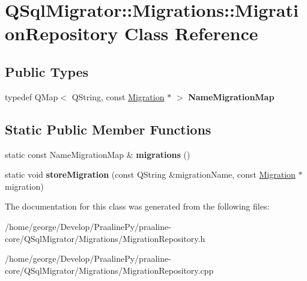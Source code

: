 \hypertarget{class_q_sql_migrator_1_1_migrations_1_1_migration_repository}{}\section{Q\+Sql\+Migrator\+:\+:Migrations\+:\+:Migration\+Repository Class Reference}
\label{class_q_sql_migrator_1_1_migrations_1_1_migration_repository}
\subsection*{Public Types}
\begin{DoxyCompactItemize}
\item 
\mbox{\label{class_q_sql_migrator_1_1_migrations_1_1_migration_repository_a5785cd65128bc316c2f01db2a0b40c44}} 
typedef Q\+Map$<$ Q\+String, const \hyperlink{class_q_sql_migrator_1_1_migrations_1_1_migration}{Migration} $\ast$ $>$ {\bfseries Name\+Migration\+Map}
\end{DoxyCompactItemize}
\subsection*{Static Public Member Functions}
\begin{DoxyCompactItemize}
\item 
\mbox{\label{class_q_sql_migrator_1_1_migrations_1_1_migration_repository_a3bd9136264bfe335175d62c8b2db08ee}} 
static const Name\+Migration\+Map \& {\bfseries migrations} ()
\item 
\mbox{\label{class_q_sql_migrator_1_1_migrations_1_1_migration_repository_a9c840ec789ab42b6caaa90b24203a087}} 
static void {\bfseries store\+Migration} (const Q\+String \&migration\+Name, const \hyperlink{class_q_sql_migrator_1_1_migrations_1_1_migration}{Migration} $\ast$migration)
\end{DoxyCompactItemize}


The documentation for this class was generated from the following files\+:\begin{DoxyCompactItemize}
\item 
/home/george/\+Develop/\+Praaline\+Py/praaline-\/core/\+Q\+Sql\+Migrator/\+Migrations/Migration\+Repository.\+h\item 
/home/george/\+Develop/\+Praaline\+Py/praaline-\/core/\+Q\+Sql\+Migrator/\+Migrations/Migration\+Repository.\+cpp\end{DoxyCompactItemize}
